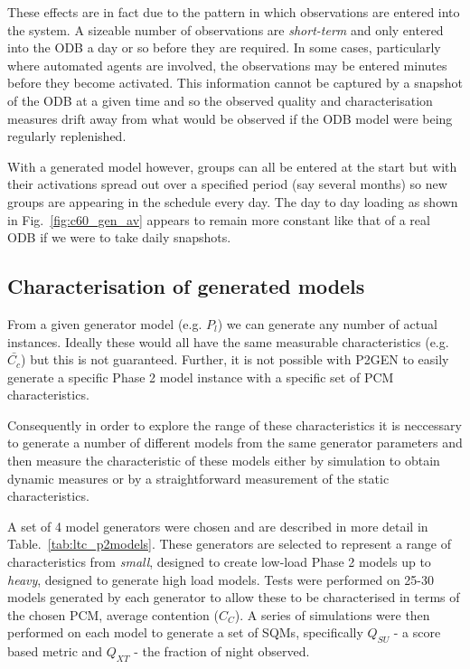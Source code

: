 These effects are in fact due to the pattern in which observations are entered into the system. A sizeable number of observations are \emph{short-term} and only entered into the ODB a day or so before they are required. In some cases, particularly where automated agents are involved, the observations may be entered minutes before they become activated. This information cannot be captured by a snapshot of the ODB at a given time and so the observed quality and characterisation measures drift away from what would be observed if the ODB model were being regularly replenished.

With a generated model however, groups can all be entered at the start but with their activations spread out over a specified period (say several months) so new groups are appearing in the schedule every day. The day to day loading as shown in Fig.~\ref{fig:c60_gen_av} appears to remain more constant like that of a real ODB if we were to take daily snapshots. 


\subsection{Characterisation of generated models}
\label{sect:chargen}
 From a given generator model (e.g. $P_l$) we can generate any number of actual instances. Ideally these would all have the same measurable characteristics (e.g. $\bar{C_c}$) but this is not guaranteed. Further, it is not possible with P2GEN to easily generate a specific Phase 2 model instance with a specific set of PCM characteristics.

Consequently in order to explore the range of these characteristics it is neccessary to generate a number of different models from the same generator parameters and then measure the characteristic of these models either by simulation to obtain dynamic measures or by a straightforward measurement of the static characteristics.

A set of 4 model generators were chosen and are described in more detail in Table.~\ref{tab:ltc_p2models}. These generators are selected to represent a range of characteristics from \emph{small}, designed to create low-load Phase 2 models up to \emph{heavy}, designed to generate high load models. Tests were performed on 25-30 models generated by each generator to allow these to be characterised in terms of the chosen PCM, average contention ($C_C$). A series of simulations were then performed on each model to generate a set of SQMs, specifically $Q_{SU}$ - a score based metric and $Q_{XT}$ - the fraction of night observed. 

